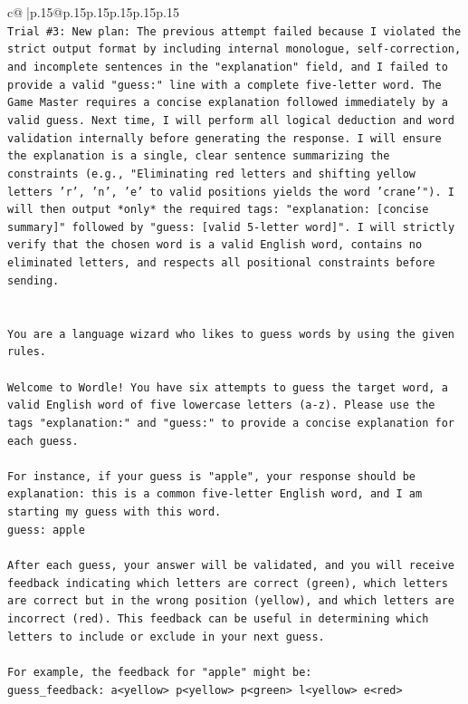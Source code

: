 \documentclass{article}
\begin{document}
{\begin{supertabular}{c@{$\;$}|p{.15\linewidth}@{}p{.15\linewidth}p{.15\linewidth}p{.15\linewidth}p{.15\linewidth}p{.15\linewidth}}
{{{\\ 
\texttt{Trial \#3: New plan: The previous attempt failed because I violated the strict output format by including internal monologue, self{-}correction, and incomplete sentences in the "explanation" field, and I failed to provide a valid "guess:" line with a complete five{-}letter word. The Game Master requires a concise explanation followed immediately by a valid guess. Next time, I will perform all logical deduction and word validation internally before generating the response. I will ensure the explanation is a single, clear sentence summarizing the constraints (e.g., "Eliminating red letters and shifting yellow letters 'r', 'n', 'e' to valid positions yields the word 'crane'"). I will then output *only* the required tags: "explanation: {[}concise summary{]}" followed by "guess: {[}valid 5{-}letter word{]}". I will strictly verify that the chosen word is a valid English word, contains no eliminated letters, and respects all positional constraints before sending.} \\
\\ 
\\ 
\texttt{You are a language wizard who likes to guess words by using the given rules.} \\
\\ 
\texttt{Welcome to Wordle! You have six attempts to guess the target word, a valid English word of five lowercase letters (a{-}z). Please use the tags "explanation:" and "guess:" to provide a concise explanation for each guess.} \\
\\ 
\texttt{For instance, if your guess is "apple", your response should be} \\
\texttt{explanation: this is a common five{-}letter English word, and I am starting my guess with this word.} \\
\texttt{guess: apple} \\
\\ 
\texttt{After each guess, your answer will be validated, and you will receive feedback indicating which letters are correct (green), which letters are correct but in the wrong position (yellow), and which letters are incorrect (red). This feedback can be useful in determining which letters to include or exclude in your next guess.} \\
\\ 
\texttt{For example, the feedback for "apple" might be:} \\
\texttt{guess\_feedback: a<yellow> p<yellow> p<green> l<yellow> e<red>} \\
}}}
\end{supertabular}}
\end{document}
